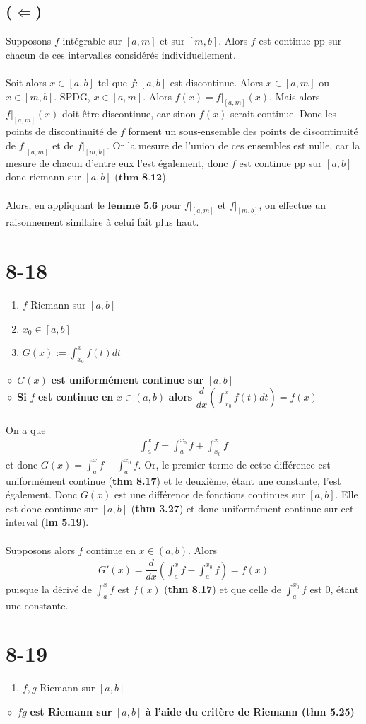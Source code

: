 \documentclass[a4paper,10pt]{article}
\begin{document}
\subsection*{($\Leftarrow$)}
Supposons $f$ intégrable sur $[a,m]$ et sur $[m,b]$. Alors $f$ est continue pp sur chacun de ces intervalles considérés
individuellement.
\\
\\
Soit alors $x \in [a,b]$ tel que $f : [a,b]$ est discontinue. Alors $x \in [a,m]$ ou $x \in [m,b]$. SPDG, $x \in [a,m]$.
Alors $f(x) = f|_{[a,m]}(x)$. Mais alors $f|_{[a,m]}(x)$ doit être discontinue, car sinon $f(x)$ serait continue. Donc 
les points de discontinuité de $f$ forment un sous-ensemble des points de discontinuité de $f|_{[a,m]}$ et de $f|_{[m,b]}$. 
Or la mesure de l'union de ces ensembles est nulle, car la mesure de chacun d'entre eux l'est également,
donc $f$ est continue pp sur $[a,b]$ donc riemann sur $[a,b]$ ($\textbf{thm 8.12}$). 
\\
\\
Alors, en appliquant le $\textbf{lemme 5.6}$ pour $f|_{[a,m]}$ et $f|_{[m,b]}$, on effectue un raisonnement similaire à celui
fait plus haut.

\section*{8-18}
\begin{enumerate}
 \item $f$ Riemann sur $[a,b]$
 \item $x_0 \in [a,b]$
 \item $G(x) := \int_{x_0}^x f(t) dt$
\end{enumerate}
$\diamond$ $G(x)$ \textbf{est uniformément continue sur } $[a,b]$
\\
$\diamond$ \textbf{Si } $f$ \textbf{est continue en} $x \in (a,b)$ \textbf{alors} $\dfrac{d}{dx} \left( \int_{x_0}^x f(t) dt \right) = f(x) $
\\
\\
On a que
\begin{align*}
 \int_a^x f = \int_a^{x_0} f + \int_{x_0}^x f
\end{align*}
et donc $G(x) = \int_a^x f - \int_a^{x_0} f$. Or, le premier terme de cette différence est uniformément continue (\textbf{thm 8.17}) 
et le deuxième, étant une constante, l'est également. Donc $G(x)$ est une différence de fonctions continues sur $[a,b]$. Elle est donc
continue sur $[a,b]$ (\textbf{thm 3.27}) et donc uniformément continue sur cet interval (\textbf{lm 5.19}).
\\
\\
Supposons alors $f$ continue en $x \in (a,b)$. Alors
\begin{align*}
 G'(x) = \dfrac{d}{dx} \left(\int_a^x f - \int_a^{x_0} f \right) = f(x)
\end{align*}
puisque la dérivé de $\int_a^x f$ est $f(x)$ (\textbf{thm 8.17}) et que celle de $\int_a^{x_0} f$ est 0, étant une constante.

\section*{8-19}
\begin{enumerate}
 \item $f,g$ Riemann sur $[a,b]$
\end{enumerate}
$\diamond$ $fg$ \textbf{ est Riemann sur } $[a,b]$ \textbf{ à l'aide du critère de Riemann (thm 5.25)}
\end{document}
